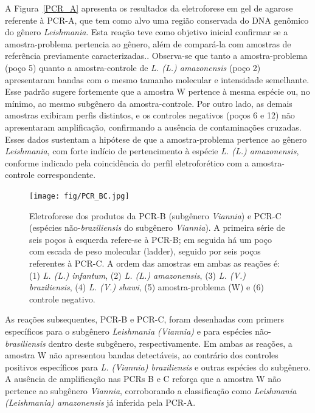 A Figura~\ref{PCR_A} apresenta os resultados da eletroforese em gel de agarose referente à PCR-A, que tem como alvo uma região conservada do DNA genômico do gênero
 \textit{Leishmania}. Esta reação teve como objetivo inicial confirmar se a amostra-problema pertencia ao gênero, além de compará-la com amostras de referência previamente 
 caracterizadas.. Observa-se que tanto a amostra-problema (poço 5) quanto a amostra-controle de \textit{L. (L.) amazonensis} (poço 2) apresentaram bandas com o mesmo tamanho 
 molecular e intensidade semelhante. Esse padrão sugere fortemente que a amostra W pertence à mesma espécie ou, no mínimo, ao mesmo subgênero da amostra-controle. Por outro 
 lado, as demais amostras  exibiram perfis distintos, e os controles negativos (poços 6 e 12) não apresentaram amplificação, confirmando a ausência de contaminações cruzadas.
Esses dados sustentam a hipótese de que a amostra-problema pertence ao gênero \textit{Leishmania}, com forte indício de pertencimento à espécie \textit{L. (L.) amazonensis}, 
conforme indicado pela coincidência do perfil eletroforético com a amostra-controle correspondente.

\begin{figure}
 \centering
 \texttt{[image: fig/PCR\_BC.jpg]}
 \caption{Eletroforese dos produtos da PCR-B (subgênero \textit{Viannia}) e PCR-C (espécies não-\textit{braziliensis} do subgênero \textit{Viannia}). 
 A primeira série de seis poços à esquerda refere-se à PCR-B; em seguida há um poço com escada de peso molecular (ladder), seguido por seis poços referentes 
 à PCR-C. A ordem das amostras em ambas as reações é: (1) \textit{L. (L.) infantum}, (2) \textit{L. (L.) amazonensis}, (3) \textit{L. (V.) braziliensis}, 
 (4) \textit{L. (V.) shawi}, (5) amostra-problema (W) e (6) controle negativo.}
 \label{pcrBC}
 \end{figure}

As reações subsequentes, PCR-B e PCR-C, foram desenhadas com primers específicos para o subgênero \textit{Leishmania (Viannia)} e para espécies não-\textit{brasiliensis} dentro 
deste subgênero, respectivamente. Em ambas as reações, a amostra W não apresentou bandas detectáveis, ao contrário dos controles positivos específicos para \textit{L. (Viannia) 
braziliensis} e outras espécies do subgênero. A ausência de amplificação nas PCRs B e C reforça que a amostra W não pertence ao subgênero \textit{Viannia}, corroborando a classificação 
como \textit{Leishmania (Leishmania) amazonensis} já inferida pela PCR-A.

